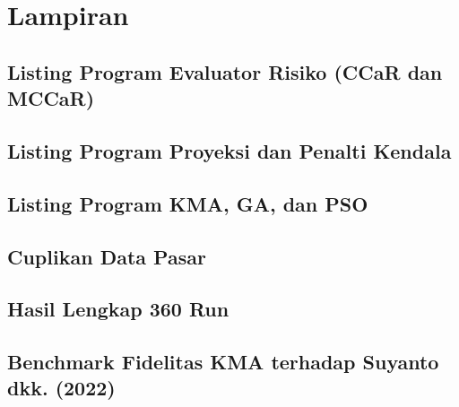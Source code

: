 \chapter{Lampiran}\label{ch:appendix}
%   

    \section{Listing Program Evaluator Risiko (CCaR dan MCCaR)}\label{app:code risk}

    \section{Listing Program Proyeksi dan Penalti Kendala}\label{app:code constraints}

    \section{Listing Program KMA, GA, dan PSO}\label{app:code optimizers}

    \section{Cuplikan Data Pasar}\label{app:data excerpt}

    \section{Hasil Lengkap 360 Run}\label{app:all runs}

    \section{Benchmark Fidelitas KMA terhadap Suyanto dkk. (2022)}\label{app:kma benchmark}
